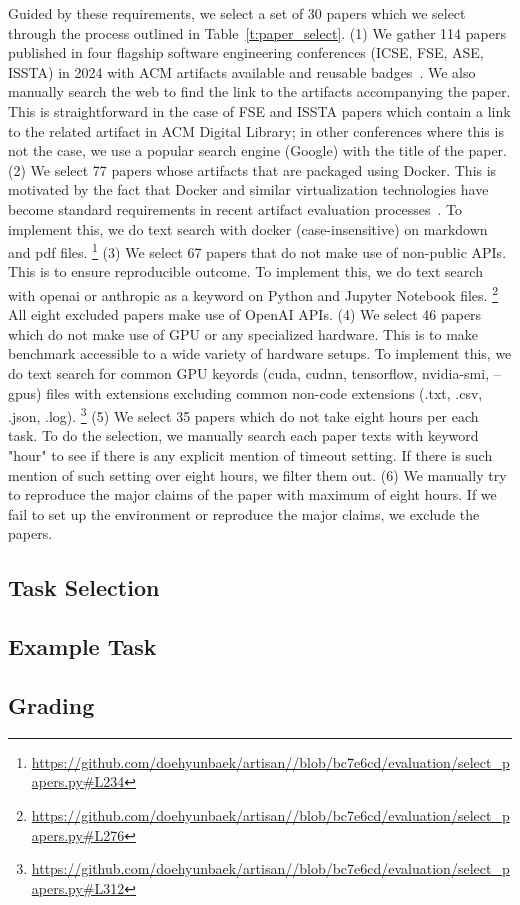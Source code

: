 Guided by these requirements, we select a set of 30 papers which we select through the process outlined in Table~\ref{t:paper_select}.
(1) We gather 114 papers published in four flagship software engineering conferences (ICSE, FSE, ASE, ISSTA) in 2024 with ACM artifacts available and reusable badges~\cite{acm-artifact-badging-v1_1}.
We also manually search the web to find the link to the artifacts accompanying the paper.
This is straightforward in the case of FSE and ISSTA papers which contain a link to the related artifact in ACM Digital Library; in other conferences where this is not the case, we use a popular search engine (Google) with the title of the paper.
(2) We select 77 papers whose artifacts that are packaged using Docker.
This is motivated by the fact that Docker and similar virtualization technologies
have become standard requirements in recent artifact evaluation processes~\cite{icse2024-ae,fse2024-ae,ase2024-ae}.
To implement this, we do text search with docker (case-insensitive) on markdown and pdf files.
\footnote{\url{https://github.com/doehyunbaek/artisan//blob/bc7e6cd/evaluation/select_papers.py\#L234}}
(3) We select 67 papers that do not make use of non-public APIs.
This is to ensure reproducible outcome.
To implement this, we do text search with openai or anthropic as a keyword on Python and Jupyter Notebook files.
\footnote{\url{https://github.com/doehyunbaek/artisan//blob/bc7e6cd/evaluation/select_papers.py\#L276}}
All eight excluded papers make use of OpenAI APIs.
(4) We select 46 papers which do not make use of GPU or any specialized hardware.
This is to make benchmark accessible to a wide variety of hardware setups.
To implement this, we do text search for common GPU keyords (cuda, cudnn, tensorflow, nvidia-smi, --gpus) files with extensions excluding common non-code extensions (.txt, .csv, .json, .log).
\footnote{\url{https://github.com/doehyunbaek/artisan//blob/bc7e6cd/evaluation/select_papers.py\#L312}}
(5) We select 35 papers which do not take eight hours per each task.
To do the selection, we manually search each paper texts with keyword "hour" to see if there is any explicit mention of timeout setting.
If there is such mention of such setting over eight hours, we filter them out.
(6) We manually try to reproduce the major claims of the paper with maximum of eight hours.
If we fail to set up the environment or reproduce the major claims, we exclude the papers.

\subsection{Task Selection}
\label{s:task_select}

\subsection{Example Task}
\label{s:task_example}

\subsection{Grading}
\label{s:grading}